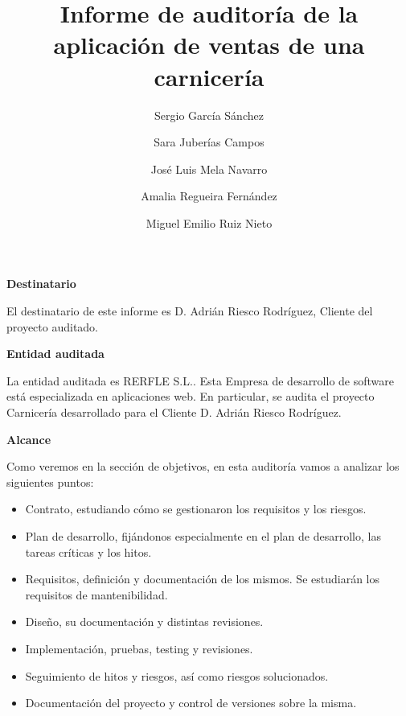 \documentclass[a4paper,12pt]{report}
\begin{document}
    \title{Informe de auditoría de la aplicación de ventas de una carnicería}
    \author{
		Sergio García Sánchez
		\and
		Sara Juberías Campos
		\and
		José Luis Mela Navarro
		\and
		Amalia Regueira Fernández
		\and
		Miguel Emilio Ruiz Nieto
    }
    
    \maketitle

\newpage
{}
\begin{center}
    {\Large \textbf{Destinatario}} 
\end{center}
\vspace{0.5cm}

El destinatario de este informe es D. Adrián Riesco Rodríguez, Cliente del proyecto auditado.
\\
\vspace{1cm}
\begin{center}
    {\Large \textbf{Entidad auditada}}
\end{center}

\vspace{0.5cm}

La entidad auditada es RERFLE S.L.. Esta Empresa de desarrollo de software está especializada
en aplicaciones web. En particular, se audita el proyecto Carnicería desarrollado para el
Cliente D. Adrián Riesco Rodríguez.\\

\vspace{1cm}

\begin{center}
    {\Large \textbf{Alcance}}
\end{center}
\vspace{0.5cm}

Como veremos en la sección de objetivos, en esta auditoría vamos a analizar los siguientes puntos:\\

\begin{itemize}
    \item Contrato, estudiando cómo se gestionaron los requisitos y los riesgos.
    \item Plan de desarrollo, fijándonos especialmente en el plan de desarrollo, las tareas críticas y los hitos.
    \item Requisitos, definición y documentación de los mismos. Se estudiarán los requisitos de mantenibilidad.
    \item Diseño, su documentación y distintas revisiones.
    \item Implementación, pruebas, testing y revisiones.
    \item Seguimiento de hitos y riesgos, así como riesgos solucionados.
    \item Documentación del proyecto y control de versiones sobre la misma.
\end{itemize}
\end{document}
